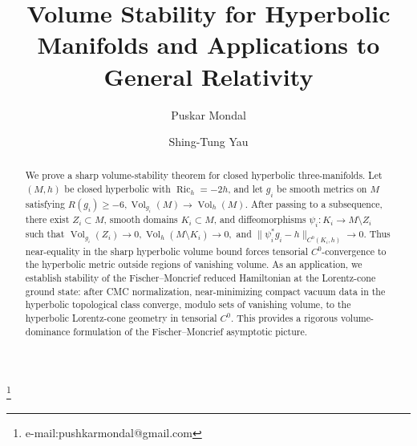 \documentclass{amsart}
\begin{document}
	
\title{Volume Stability for Hyperbolic Manifolds and Applications to General Relativity}


\author{Puskar Mondal}\footnote{e-mail:pushkarmondal@gmail.com}%
\author{Shing-Tung Yau} %



\maketitle

	





\begin{abstract}
We prove a sharp volume-stability theorem for closed hyperbolic three-manifolds. Let \((M,h)\) be closed hyperbolic with \(\operatorname{Ric}_h=-2h\), and let \(g_i\) be smooth metrics on \(M\) satisfying
$R(g_i)\geq -6,
\operatorname{Vol}_{g_i}(M)\longrightarrow \operatorname{Vol}_h(M)$.
After passing to a subsequence, there exist \(Z_i\subset M\), smooth domains \(K_i\subset M\), and diffeomorphisms
$\psi_i:K_i\longrightarrow M\setminus Z_i
$
such that
$\operatorname{Vol}_{g_i}(Z_i)\longrightarrow0,
\operatorname{Vol}_h(M\setminus K_i)\longrightarrow0,
$
and
$
\|\psi_i^*g_i-h\|_{C^0(K_i,h)}\longrightarrow0.
$
Thus near-equality in the sharp hyperbolic volume bound forces tensorial \(C^0\)-convergence to the hyperbolic metric outside regions of vanishing volume. As an application, we establish stability of the Fischer--Moncrief reduced Hamiltonian at the Lorentz-cone ground state: after CMC normalization, near-minimizing compact vacuum data in the hyperbolic topological class converge, modulo sets of vanishing volume, to the hyperbolic Lorentz-cone geometry in tensorial \(C^0\). This provides a rigorous volume-dominance formulation of the Fischer--Moncrief asymptotic picture.
\end{abstract}





\setcounter{tocdepth}{2}
{\hypersetup{linkcolor=black}
\small
\tableofcontents
}
\end{document}

